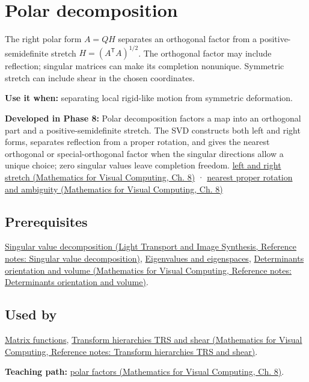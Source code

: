 \hypertarget{appendix-73f5bcf7a462}{}\label{referencestart:appendix-73f5bcf7a462}
\section{Polar decomposition}\label{appendix-73f5bcf7a462-polar-decomposition}

The right polar form \(A=QH\) separates an orthogonal factor from a positive-semidefinite stretch \(H=(A^\mathsf T A)^{1/2}\). The orthogonal factor may include reflection; singular matrices can make its completion nonunique. Symmetric stretch can include shear in the chosen coordinates.

\textbf{Use it when:} separating local rigid-like motion from symmetric deformation.

\textbf{Developed in Phase 8:} Polar decomposition factors a map into an orthogonal part and a positive-semidefinite stretch. The SVD constructs both left and right forms, separates reflection from a proper rotation, and gives the nearest orthogonal or special-orthogonal factor when the singular directions allow a unique choice; zero singular values leave completion freedom. \href{../02-Mathematics-for-Visual-Computing/main.pdf\#nameddest=02-foundations-ii-ch024-polar-decomposition-separates-frame-dependent-stretch-from-orientation}{left and right stretch (Mathematics for Visual Computing, Ch. 8)} · \href{../02-Mathematics-for-Visual-Computing/main.pdf\#nameddest=02-foundations-ii-ch024-two-sided-rotations-nearest-proper-rotation-and-nonunique-directions}{nearest proper rotation and ambiguity (Mathematics for Visual Computing, Ch. 8)}

\subsection{Prerequisites}\label{appendix-73f5bcf7a462-prerequisites}

\href{../04-Light-Transport-and-Image-Synthesis/main.pdf\#nameddest=appendix-1fad5e7f36fa}{Singular value decomposition (Light Transport and Image Synthesis, Reference notes: Singular value decomposition)}, \hyperref[appendix-0b3be18411f9]{Eigenvalues and eigenspaces}, \href{../02-Mathematics-for-Visual-Computing/main.pdf\#nameddest=appendix-da478be01d02}{Determinants orientation and volume (Mathematics for Visual Computing, Reference notes: Determinants orientation and volume)}.

\subsection{Used by}\label{appendix-73f5bcf7a462-used-by}

\hyperref[appendix-0f4bc2bf2b1f]{Matrix functions}, \href{../02-Mathematics-for-Visual-Computing/main.pdf\#nameddest=appendix-292c061cd47c}{Transform hierarchies TRS and shear (Mathematics for Visual Computing, Reference notes: Transform hierarchies TRS and shear)}.

\textbf{Teaching path:} \href{../02-Mathematics-for-Visual-Computing/main.pdf\#nameddest=02-foundations-ii-ch024-polar-decomposition-separates-rotation-like-motion-from-stretch}{polar factors (Mathematics for Visual Computing, Ch. 8)}.
